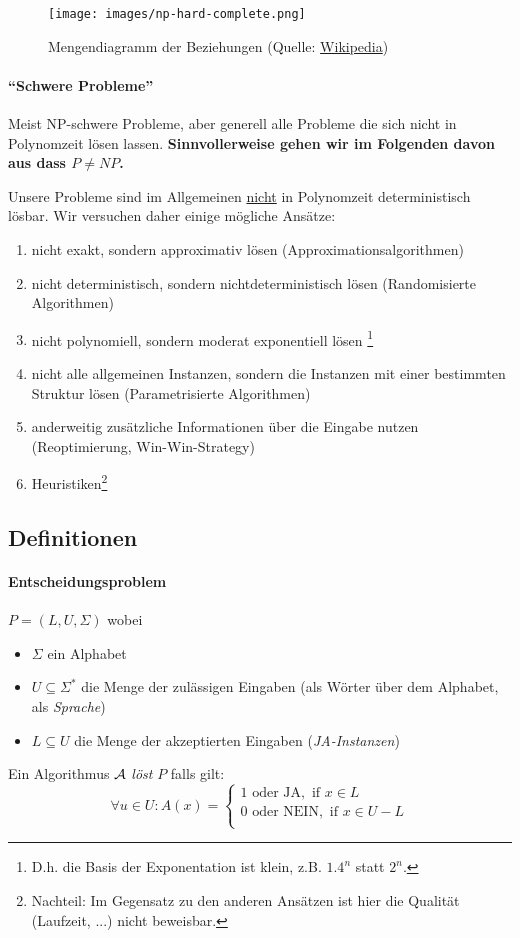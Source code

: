 \begin{figure}[h]
    \centering
    \texttt{[image: images/np-hard-complete.png]}
    \caption{Mengendiagramm der Beziehungen (Quelle: \href{https://commons.wikimedia.org/w/index.php?curid=3532181}{Wikipedia})}
    \label{fig:np-hard-complete}
\end{figure}

\paragraph{``Schwere Probleme''}
Meist NP-schwere Probleme, aber generell alle Probleme die sich nicht in Polynomzeit lösen lassen.
\textbf{Sinnvollerweise gehen wir im Folgenden davon aus dass $P \neq NP$.}

Unsere Probleme sind im Allgemeinen \underline{nicht} in Polynomzeit deterministisch lösbar.
Wir versuchen daher einige mögliche Ansätze:
\begin{enumerate}[label=\alph*)]
    \item nicht exakt, sondern approximativ lösen (Approximationsalgorithmen)
    \item nicht deterministisch, sondern nichtdeterministisch lösen (Randomisierte Algorithmen)
    \item nicht polynomiell, sondern moderat exponentiell lösen%
    \footnote{D.h. die Basis der Exponentation ist klein, z.B. $1.4^n$ statt $2^n$.}
    \item nicht alle allgemeinen Instanzen, sondern die Instanzen mit einer bestimmten Struktur lösen (Parametrisierte Algorithmen)
    \item anderweitig zusätzliche Informationen über die Eingabe nutzen (Reoptimierung, Win-Win-Strategy)
    \item Heuristiken\footnote{Nachteil: Im Gegensatz zu den anderen Ansätzen ist hier die Qualität (Laufzeit, ...) nicht beweisbar.}
\end{enumerate}


\subsection{Definitionen}

\paragraph{Entscheidungsproblem}
$P = (L, U, \Sigma)$ wobei
\begin{itemize}
    \item $\Sigma$ ein Alphabet
    \item $U \subseteq \Sigma^*$ die Menge der zulässigen Eingaben (als Wörter über dem Alphabet, als \emph{Sprache})
    \item $L \subseteq U$ die Menge der akzeptierten Eingaben (\emph{JA-Instanzen})
\end{itemize}
Ein Algorithmus $\mathcal{A}$ \emph{löst} $P$ falls gilt:
$$ \forall u \in U : A(x) =
\begin{cases}
1 \text{ oder JA}, \text{ if } x \in L \\
0 \text{ oder NEIN}, \text{ if } x \in U-L \\
\end{cases}
$$

